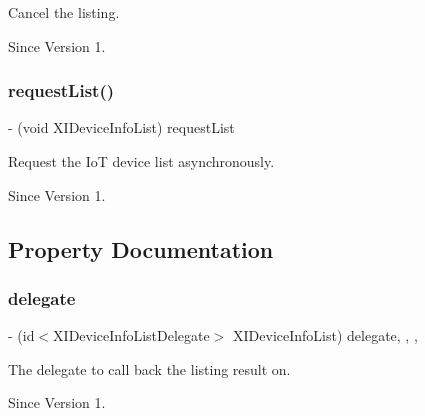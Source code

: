 Cancel the listing. 

\begin{DoxySince}{Since}
Version 1. 
\end{DoxySince}
\hypertarget{protocol_x_i_device_info_list_01-p_ad798692bcddc49778e90cf56609759d0}{}\label{protocol_x_i_device_info_list_01-p_ad798692bcddc49778e90cf56609759d0} 
\subsubsection{\texorpdfstring{request\+List()}{requestList()}}
{\footnotesize\ttfamily -\/ (void X\+I\+Device\+Info\+List) request\+List \begin{DoxyParamCaption}{ }\end{DoxyParamCaption}}



Request the IoT device list asynchronously. 

\begin{DoxySince}{Since}
Version 1. 
\end{DoxySince}


\subsection{Property Documentation}
\hypertarget{protocol_x_i_device_info_list_01-p_a9daf5d68e18545626decef3f9cb3a2e5}{}\label{protocol_x_i_device_info_list_01-p_a9daf5d68e18545626decef3f9cb3a2e5} 
\subsubsection{\texorpdfstring{delegate}{delegate}}
{\footnotesize\ttfamily -\/ (id$<$X\+I\+Device\+Info\+List\+Delegate$>$ X\+I\+Device\+Info\+List) delegate\hspace{0.3cm}{\ttfamily [read]}, {\ttfamily [write]}, {\ttfamily [nonatomic]}, {\ttfamily [weak]}}



The delegate to call back the listing result on. 

\begin{DoxySince}{Since}
Version 1. 
\end{DoxySince}
\hypertarget{protocol_x_i_device_info_list_01-p_a5a8499ea5b29fd498b9bac875e1fed36}{}\label{protocol_x_i_device_info_list_01-p_a5a8499ea5b29fd498b9bac875e1fed36} 
